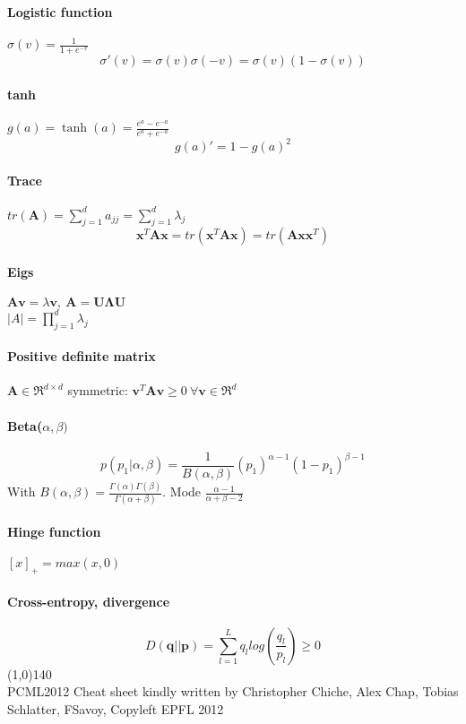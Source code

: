 \documentclass[7pt]{scrartcl}
\renewcommand{\vec}{\mathbf}
\begin{document}
\begin{multicols}{4}
\paragraph{Logistic function}
$\sigma(v) = \frac{1}{1+e^{-v}}$
$$\sigma'(v) = \sigma(v)\sigma(-v) = \sigma(v)(1-\sigma(v))$$
\paragraph{tanh}
$g(a)=\tanh(a)=\frac{e^a-e^{-a}}{e^a + e^{-a}}$
$$g(a)'=1 - g(a)^2$$
\paragraph{Trace}
$tr(\vec{A}) = \sum_{j=1}^{d}a_{jj} = \sum_{j=1}^d \lambda_j$
\[\vec{x}^T \vec{A} \vec{x} = tr(\vec{x}^T \vec{A} \vec{x}) = tr(\vec{A} \vec{xx}^T)\]
\paragraph{Eigs}
$\vec{Av} = \lambda \vec{v}, ~\vec{A} = \vec{U \Lambda U}$\\
$|A| = \prod_{j=1}^d \lambda_j$
\paragraph{Positive definite matrix} $\vec A \in \Re^ {d\times d}$ symmetric:
$\vec v^T \vec A \vec v \geq 0 ~ \forall \vec v \in \Re^d$
\paragraph{Beta($\alpha,\beta)$}
\[p(p_1|\alpha,\beta) = \frac{1}{B(\alpha,\beta)}(p_1)^{\alpha-1}(1-p_1)^{\beta -1}\]
With $B(\alpha,\beta) = \frac{\Gamma(\alpha)\Gamma(\beta)}{\Gamma(\alpha + \beta)}$.
Mode $\frac{\alpha - 1}{\alpha + \beta - 2}$
\paragraph{Hinge function}
$[x]_+ = max(x,0)$
\paragraph{Cross-entropy, divergence}
\[D(\vec{q}||\vec{p}) = \sum_{l=1}^L q_l log(\frac{q_l}{p_l}) \geq 0\]
\line(1,0){140} \\
\tiny
PCML2012 Cheat sheet kindly written by Christopher Chiche, Alex Chap, Tobias Schlatter, FSavoy, Copyleft EPFL 2012 
\end{multicols}
\end{document}
